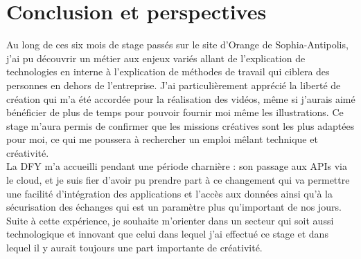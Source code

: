 \chapter*{Conclusion et perspectives}
\label{sec:conclusion}

Au long de ces six mois de stage passés sur le site d'Orange de Sophia-Antipolis, j'ai pu découvrir un métier aux enjeux variés allant de l'explication de technologies en interne à 
l'explication de méthodes de travail qui ciblera des personnes en dehors de l'entreprise. 
J'ai particulièrement apprécié la liberté de création qui m'a été accordée pour la réalisation des vidéos, même si j'aurais aimé bénéficier de plus de temps pour pouvoir fournir moi même les illustrations. Ce stage m'aura permis de confirmer que les missions créatives sont les plus adaptées pour moi, ce qui me poussera à rechercher un emploi mêlant technique et créativité.\\

La DFY m’a accueilli pendant une période charnière : son passage aux APIs via le cloud, et je suis fier d’avoir pu prendre part à ce changement qui va permettre une facilité d'intégration des applications et l'accès aux données ainsi qu'à la sécurisation des échanges qui est un paramètre plus qu'important de nos jours.\\

Suite à cette expérience, je souhaite m'orienter dans un secteur qui soit aussi technologique et innovant que celui dans lequel j'ai effectué ce stage et dans lequel il y aurait toujours une part importante de créativité.



